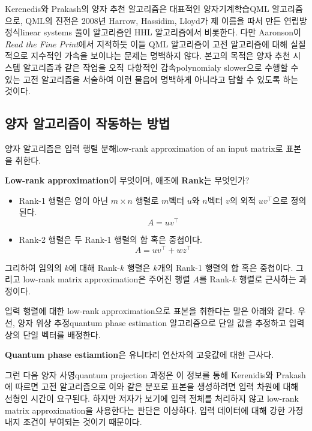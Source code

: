 \documentclass[a4paper,atbegshi,chapter]{oblivoir}
\begin{document}
Kerenedis와 Prakash의 양자 추천 알고리즘은 대표적인 양자기계학습{\tiny QML}
알고리즘으로, QML의 진전은 2008년 Harrow, Hassidim, Lloyd가 제 이름을 따서
만든 연립방정식{\tiny linear systems} 풀이 알고리즘인 HHL 알고리즘에서 
비롯한다. 다만 Aaronson이 \emph{Read the Fine Print}에서 지적하듯
이들 QML 알고리즘이 고전 알고리즘에 대해 실질적으로 지수적인 가속을 보이냐는
문제는 명백하지 않다. 본고의 목적은 양자 추천 시스템 알고리즘과 같은 작업을
오직 다항적인 감속{\tiny polynomialy slower}으로 수행할 수 있는 고전 알고리즘을
서술하여 이런 물음에 명백하게 아니라고 답할 수 있도록 하는 것이다.
\subsection{양자 알고리즘이 작동하는 방법}
양자 알고리즘은 입력 행렬 분해{\tiny low-rank approximation of an input matrix}로
표본을 취한다. 
\begin{mdframed}
  \textbf{Low-rank approximation}이 무엇이며, 애초에 \textbf{Rank}는 무엇인가?
  \begin{itemize}
    \item Rank-1 행렬은 영이 아닌 $m\times n$ 행렬로 $m$벡터 $u$와 $n$벡터 $v$의
      외적 $uv^{\top}$으로 정의된다.
      \[
        A=uv^{\top}
      \]
    \item Rank-2 행렬은 두 Rank-1 행렬의 합 혹은 중첩이다.
      \[
        A=uv^{\top}+wz^{\top}
      \]
  \end{itemize}
  그리하여 임의의 $k$에 대해 Rank-$k$ 행렬은 $k$개의 Rank-1 행렬의 합 혹은
  중첩이다. 그리고 low-rank matrix approximation은 주어진 행렬 $A$를 Rank-$k$
  행렬로 근사하는 과정이다.  
\end{mdframed}
입력 행렬에 대한 low-rank approximation으로 표본을 취한다는 말은 아래와 같다.
우선, 양자 위상 추정{\tiny quantum phase estimation} 알고리즘으로 단일 값을
추정하고 입력상의 단일 벡터를 배정한다. 
\begin{mdframed}
  \textbf{Quantum phase estiamtion}은 유니타리 연산자의 고윳값에 대한 근사다.
\end{mdframed}
그런 다음 양자 사영{\tiny quantum projection} 과정은 이 정보를 통해 
Kerenidis와 Prakash에 따르면 고전 알고리즘으로 이와 같은 분포로 표본을
생성하려면 입력 차원에 대해 선형인 시간이 요구된다. 하지만 저자가 보기에
입력 전체를 처리하지 않고 low-rank matrix approximation을 사용한다는 판단은
이상하다. 입력 데이터에 대해 강한 가정 내지 조건이 부여되는 것이기 때문이다.
\end{document}
